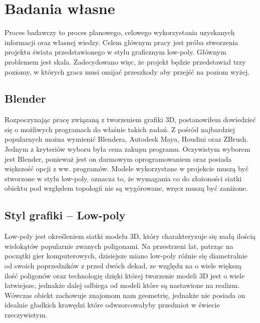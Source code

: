 \chapter{Badania własne}
\indent Proces badawczy to proces planowego, celowego wykorzystania uzyskanych informacji oraz własnej wiedzy. Celem głównym pracy jest próba stworzenia projektu świata przedstawionego w stylu graficznym low-poly. Głównym problemem jest skala. Zadecydowano więc, że projekt będzie przedstawiał trzy poziomy, w których gracz musi omijać przeszkody aby przejść na poziom wyżej.

\section{Blender}
\indent Rozpoczynając pracę związaną z tworzeniem grafiki 3D, postanowiłem dowiedzieć się o możliwych programach do właśnie takich zadań. Z pośród najbardziej popularnych można wymienić Blendera, Autodesk Maya, Houdini oraz ZBrush. Jednym z kryteriów wyboru była cena zakupu programu. Oczywistym wyborem jest Blender, ponieważ jest on darmowym oprogramowaniem oraz posiada większość opcji z ww. programów. Modele wykorzystane w projekcie muszą być stworzone w stylu low-poly, oznacza to, że wymagania co do złożoności siatki obiektu pod względem topologii nie są wygórowane, wręcz muszą być zaniżone. 
\section{Styl grafiki -- Low-poly}

\indent Low-poly jest określeniem siatki modelu 3D, który charakteryzuje się małą ilością wielokątów popularnie zwanych poligonami. Na przestrzeni lat, patrząc na początki gier komputerowych, dzisiejsze miano low-poly róźnie się diametralnie od swoich poprzedników z przed dwóch dekad, ze względu na o wiele większą ilość poligonów oraz technologię dzięki której tworzenie modeli 3D jest o wiele łatwiejsze, jednakże dalej odbiega od modeli które są nastawione na realizm. Wówczas obiekt zachowuje znajomom nam geometrię, jednakże nie posiada on idealnie gładkich krawędzi które odwzorcowałyby przedmiot w świecie rzeczywistym.

